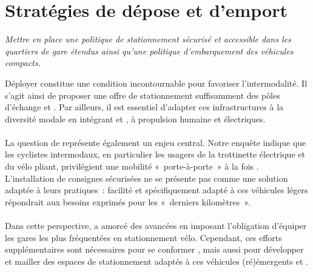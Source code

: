 \documentclass[../main.tex]{subfiles}
\begin{document}
    \newpage

    \vspace{15pt}
\section{Stratégies de dépose et d'emport}

\begin{block}[Équiper]
    \linespread{0.9}\selectfont %
    \textit{\small{Mettre en place une politique de stationnement sécurisé et accessible dans les quartiers de gare étendus ainsi qu'une politique d'embarquement des véhicules compacts.}}
\end{block}


    \begin{multicols}{2}
    \raggedcolumns
    \small{
Déployer  constitue une condition incontournable pour favoriser l'intermodalité. Il s'agit ainsi de proposer une offre de stationnement suffisamment  des pôles d'échange et . Par ailleurs, il est essentiel d'adapter ces infrastructures à la diversité modale en intégrant  et , à propulsion humaine et électriques.
    \\\\
La question de  représente également un enjeu central. Notre enquête indique que les cyclistes intermodaux, en particulier les usagers de la trottinette électrique et du vélo pliant, privilégient une mobilité «~porte-à-porte~» à la fois . L'installation de consignes sécurisées ne se présente pas comme une solution adaptée à leurs pratiques~:  facilité et spécifiquement adapté à ces véhicules légers répondrait aux besoins exprimés pour les «~derniers kilomètres~».
    \\\\
Dans cette perspective,  a amorcé des avancées en imposant l'obligation d'équiper les gares les plus fréquentées en stationnement vélo. Cependant, ces efforts supplémentaires sont nécessaires pour se conformer , mais aussi pour développer et mailler des espaces de stationnement adaptés à ces véhicules (ré)émergents et .
    }
    \end{multicols}
\end{document}
